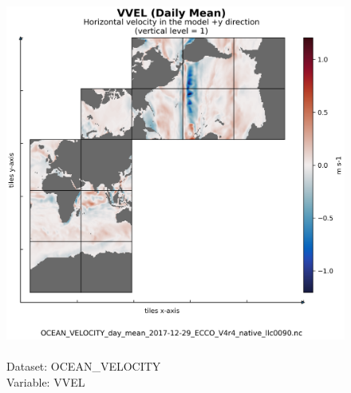 \begin{longtable}{|p{}|p{}|p{}|p{}|}
\end{longtable}

\begin{figure}[H]
\centering
\includegraphics[scale=0.5]{../images/plots/native_plots/Ocean_Velocity/VVEL.png}
\caption{\\Dataset: OCEAN\_VELOCITY\\Variable: VVEL}
\label{tab:table-OCEAN_VELOCITY_VVEL-Plot}
\end{figure}
\pagebreak
